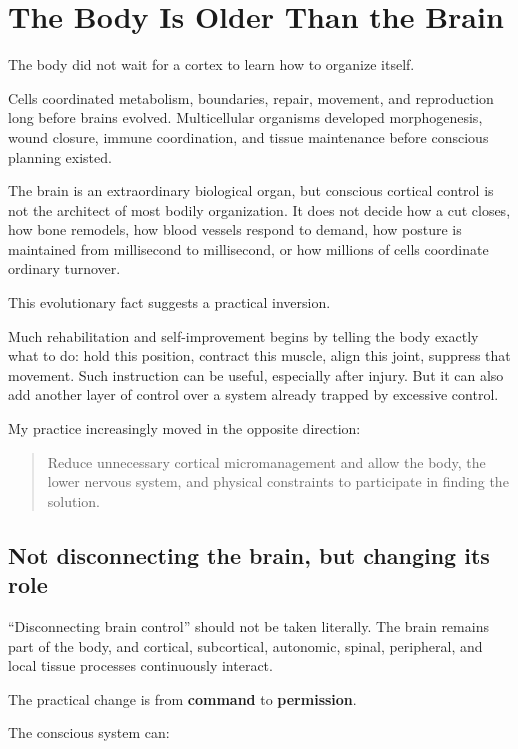 \chapter{The Body Is Older Than the Brain}

The body did not wait for a cortex to learn how to organize itself.

Cells coordinated metabolism, boundaries, repair, movement, and reproduction long before brains evolved. Multicellular organisms developed morphogenesis, wound closure, immune coordination, and tissue maintenance before conscious planning existed.

The brain is an extraordinary biological organ, but conscious cortical control is not the architect of most bodily organization. It does not decide how a cut closes, how bone remodels, how blood vessels respond to demand, how posture is maintained from millisecond to millisecond, or how millions of cells coordinate ordinary turnover.

This evolutionary fact suggests a practical inversion.

Much rehabilitation and self-improvement begins by telling the body exactly what to do: hold this position, contract this muscle, align this joint, suppress that movement. Such instruction can be useful, especially after injury. But it can also add another layer of control over a system already trapped by excessive control.

My practice increasingly moved in the opposite direction:

\begin{quote}
Reduce unnecessary cortical micromanagement and allow the body, the lower nervous system, and physical constraints to participate in finding the solution.
\end{quote}

\section{Not disconnecting the brain, but changing its role}

``Disconnecting brain control'' should not be taken literally. The brain remains part of the body, and cortical, subcortical, autonomic, spinal, peripheral, and local tissue processes continuously interact.

The practical change is from \textbf{command} to \textbf{permission}.

The conscious system can:

